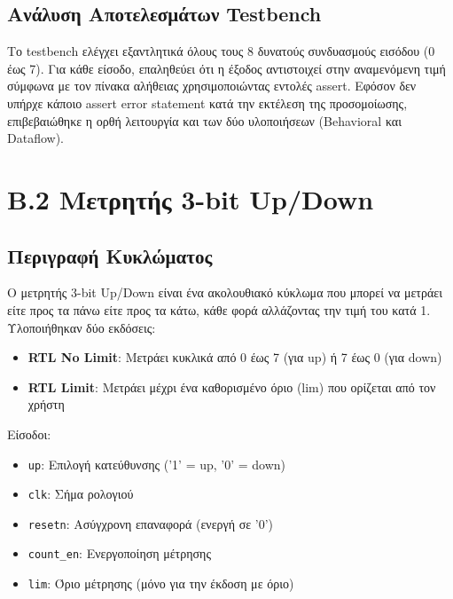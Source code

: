 \documentclass[12pt]{article}
\begin{document}
\subsection*{Ανάλυση Αποτελεσμάτων Testbench}

Το testbench ελέγχει εξαντλητικά όλους τους 8 δυνατούς συνδυασμούς εισόδου (0 έως 7). Για κάθε είσοδο, επαληθεύει ότι η έξοδος αντιστοιχεί στην αναμενόμενη τιμή σύμφωνα με τον πίνακα αλήθειας χρησιμοποιώντας εντολές assert. Εφόσον δεν υπήρχε κάποιο assert error statement κατά την εκτέλεση της προσομοίωσης, επιβεβαιώθηκε η ορθή λειτουργία και των δύο υλοποιήσεων (Behavioral και Dataflow).

\newpage
\section*{Β.2 Μετρητής 3-bit Up/Down}

\subsection*{Περιγραφή Κυκλώματος}

Ο μετρητής 3-bit Up/Down είναι ένα ακολουθιακό κύκλωμα που μπορεί να μετράει είτε προς τα πάνω είτε προς τα κάτω, κάθε φορά αλλάζοντας την τιμή του κατά 1. Υλοποιήθηκαν δύο εκδόσεις:

\begin{itemize}
    \item \textbf{RTL No Limit}: Μετράει κυκλικά από 0 έως 7 (για up) ή 7 έως 0 (για down)
    \item \textbf{RTL Limit}: Μετράει μέχρι ένα καθορισμένο όριο (lim) που ορίζεται από τον χρήστη
\end{itemize}

Είσοδοι:
\begin{itemize}
    \item \texttt{up}: Επιλογή κατεύθυνσης ('1' = up, '0' = down)
    \item \texttt{clk}: Σήμα ρολογιού
    \item \texttt{resetn}: Ασύγχρονη επαναφορά (ενεργή σε '0')
    \item \texttt{count\_en}: Ενεργοποίηση μέτρησης
    \item \texttt{lim}: Όριο μέτρησης (μόνο για την έκδοση με όριο)
\end{itemize}
\end{document}
